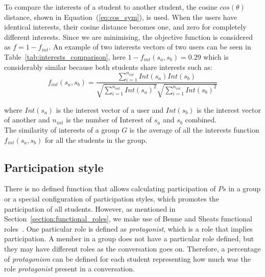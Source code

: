 To compare the interests of a student to another student, the cosine $cos(\theta)$ distance, shown in Equation~(\ref{eq:cos_sym}), is used. When the users have identical interests, their cosine distance becomes one, and zero for completely different interests. Since we are minimising, the objective function is considered as $f = 1 - f_{int}$. An example of two interests vectors of two users can be seen in Table~\ref{tab:interests_comparison}, here $1 - f_{int}(s_a,s_b) = 0.29$ which is considerably similar because both students share interests such as: \\

\begin{equation} \label{eq:cos_sym}
     f_{int}(s_a,s_b) = \frac{ \sum\limits_{i=1}^{n_{int}}{Int(s_a)  Int(s_b)} }{ \sqrt{\sum\limits_{i=1}^{n_{int}}{Int(s_a)^2}}  \sqrt{\sum\limits_{i=1}^{n_{int}}{Int(s_b)^2}} }   
\end{equation}

\noindent where $Int(s_a)$ is the interest vector of a user and $Int(s_b)$ is the interest vector of another and $n_{int}$ is the number of Interest of $s_a$ and $s_b$ combined.\\

The similarity of interests of a group $G$ is the average of all the interests function $f_{int}(s_a,s_b)$ for all the students in the group.\\

\subsection{Participation style}


There is no defined function that allows calculating participation of $Ps$ in a group or a special configuration of participation styles, which promotes the participation of all students. 
However, as mentioned in Section~\ref{section:functional_roles}, we make use of Benne and Sheats functional roles~\cite{FunctionalRoles}. One particular role is defined as \textit{protagonist}, which is a role that implies participation. A member in a group does not have a particular role defined, but they may have different roles as the conversation goes on. Therefore, a percentage of \textit{protagonism} can be defined for each student representing how much was the role \textit{protagonist} present in a conversation.\\

